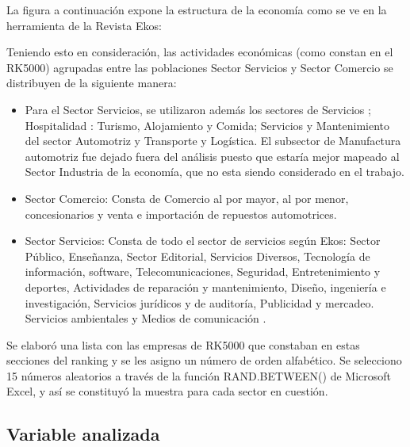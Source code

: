 \documentclass[12pt,a4paper,twoside]{article}
\begin{document}
La figura a continuación expone la estructura de la economía como se ve en la herramienta de la Revista Ekos:
\begin{figure}[H]
\end{figure}
Teniendo esto en consideración, las actividades económicas (como constan en el RK5000) agrupadas entre las poblaciones Sector Servicios y Sector Comercio se distribuyen de la siguiente manera:
\begin{itemize}
      \item Para el Sector Servicios, se utilizaron además los sectores  de Servicios ; Hospitalidad : Turismo, Alojamiento y Comida; Servicios y Mantenimiento del sector Automotriz y Transporte y Logística. El subsector de Manufactura automotriz fue dejado fuera del análisis puesto que estaría mejor mapeado al Sector Industria de la economía, que no esta siendo considerado en el trabajo.  
    \item Sector Comercio: Consta de Comercio al por mayor, al por menor, concesionarios y venta e importación de repuestos automotrices.
    \item Sector Servicios: Consta de todo el sector de servicios según Ekos: Sector Público, Enseñanza, Sector Editorial, Servicios Diversos, Tecnología de información, software, Telecomunicaciones, Seguridad, Entretenimiento y deportes, Actividades de reparación y mantenimiento, Diseño, ingeniería e investigación, Servicios jurídicos y de auditoría, Publicidad y mercadeo. Servicios ambientales y Medios de comunicación \parencite{manualpararevistaekos}.
  \end{itemize}

Se elaboró una lista con las empresas de RK5000 que constaban en estas secciones del ranking y se les asigno un número de orden alfabético. Se selecciono 15 números aleatorios a través de la función RAND.BETWEEN() de Microsoft Excel, y así se constituyó la muestra para cada sector en cuestión. 

\subsection{Variable analizada}
\end{document}
